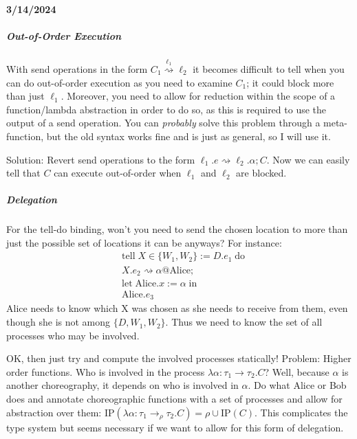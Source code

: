 \documentclass{article}
\theoremstyle{definition}
\begin{document}
\paragraph{3/14/2024}
\subparagraph{Out-of-Order Execution}
With send operations in the form $C_1 \overset{\ell_1}{\rightsquigarrow} \ell_2$ it becomes difficult to tell when you can do out-of-order execution as you need to examine $C_1$; it could block more than just $\ell_1$. Moreover, you need to allow for reduction within the scope of a function/lambda abstraction in order to do so, as this is required to use the output of a send operation. You can \emph{probably} solve this problem through a meta-function, but the old syntax works fine and is just as general, so I will use it.

Solution: Revert send operations to the form $\ell_1.e \rightsquigarrow \ell_2.\alpha; C$. Now we can easily tell that $C$ can execute out-of-order when $\ell_1$ and $\ell_2$ are blocked.

\subparagraph{Delegation}
For the tell-do binding, won't you need to send the chosen location to more than just the possible set of locations it can be anyways? For instance:
\begin{align*}
	&\text{tell}\; X \in \{W_1,W_2\} := D.e_1 \;\text{do}\\
	&X.e_2 \rightsquigarrow \alpha @ \text{Alice};\\
	&\text{let}\; \text{Alice}.x := \alpha \;\text{in}\\
	&\text{Alice}.e_3
\end{align*}
Alice needs to know which X was chosen as she needs to receive from them, even though she is not among $\{D,W_1,W_2\}$. Thus we need to know the set of all processes who may be involved.

OK, then just try and compute the involved processes statically! Problem: Higher order functions. Who is involved in the process $\lambda \alpha : \tau_1 \rightarrow \tau_2.C$? Well, because $\alpha$ is another choreography, it depends on who is involved in $\alpha$. Do what Alice or Bob does and annotate choreographic functions with a set of processes and allow for abstraction over them: $\text{IP}(\lambda \alpha : \tau_1 \rightarrow_\rho \tau_2.C) = \rho \cup \text{IP}(C)$. This complicates the type system but seems necessary if we want to allow for this form of delegation.
\end{document}

